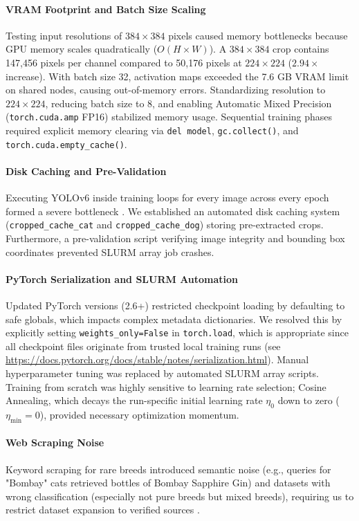 \paragraph{VRAM Footprint and Batch Size Scaling}
Testing input resolutions of $384 \times 384$ pixels caused memory bottlenecks because GPU memory scales quadratically ($O(H \times W)$). A $384 \times 384$ crop contains 147,456 pixels per channel compared to 50,176 pixels at $224 \times 224$ ($2.94\times$ increase). With batch size 32, activation maps exceeded the 7.6 GB VRAM limit on shared nodes, causing out-of-memory errors. Standardizing resolution to $224 \times 224$, reducing batch size to 8, and enabling Automatic Mixed Precision (\texttt{torch.cuda.amp} FP16) \cite{paszke2019pytorch} stabilized memory usage. Sequential training phases required explicit memory clearing via \texttt{del model}, \texttt{gc.collect()}, and \texttt{torch.cuda.empty\_cache()}.

\paragraph{Disk Caching and Pre-Validation}
Executing YOLOv6 inside training loops for every image across every epoch formed a severe bottleneck \cite{li2022yolov6}. We established an automated disk caching system (\texttt{cropped\_cache\_cat} and \texttt{cropped\_cache\_dog}) storing pre-extracted crops. Furthermore, a pre-validation script verifying image integrity and bounding box coordinates prevented SLURM array job crashes.

\paragraph{PyTorch Serialization and SLURM Automation}
Updated PyTorch versions (2.6+) restricted checkpoint loading by defaulting to safe globals, which impacts complex metadata dictionaries. We resolved this by explicitly setting \texttt{weights\_only=False} in \texttt{torch.load}, which is appropriate since all checkpoint files originate from trusted local training runs (see \url{https://docs.pytorch.org/docs/stable/notes/serialization.html}). Manual hyperparameter tuning was replaced by automated SLURM array scripts. Training from scratch was highly sensitive to learning rate selection; Cosine Annealing, which decays the run-specific initial learning rate $\eta_0$ down to zero ($\eta_{\text{min}} = 0$), provided necessary optimization momentum.

\paragraph{Web Scraping Noise}
Keyword scraping for rare breeds introduced semantic noise (e.g., queries for "Bombay" cats retrieved bottles of Bombay Sapphire Gin) and datasets with wrong classification (especially not pure breeds but mixed breeds), requiring us to restrict dataset expansion to verified sources \cite{unsplash, pixabay}.

